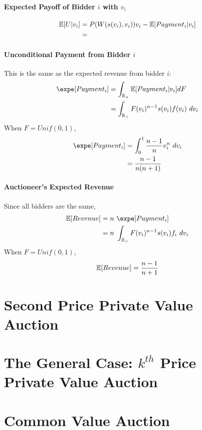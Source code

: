 \documentclass{article}
\begin{document}
	\paragraph{Expected Payoff of Bidder $i$ with $v_i$} 
	\begin{align}
		\mathbb{E}[{U|v_i}] &= P(W(s(v_i), v_i)) v_i - \mathbb{E}[{Payment_i|v_i}] \\
		&= 
	\end{align}
	
	\paragraph{Unconditional Payment from Bidder $i$} This is the same as the expected revenue from bidder $i$:
	\begin{align}
		\expe [Payment_i] &= \int_{\R_+} \expect{Payment_i|v_i} dF \\
		&= \int_{\R_+} F(v_i)^{n-1} s(v_i) f(v_i)\ dv_i
	\end{align}
	When $F = Unif(0, 1)$,
	\begin{align}
		\expe [Payment_i] &= \int_0^1 \frac{n-1}{n}v_i^n\ dv_i \\
		&= \frac{n-1}{n(n+1)}
	\end{align}
	
	\paragraph{Auctioneer's Expected Revenue} Since all bidders are the same,
	\begin{align}
		\expect{Revenue} &= n\ \expe [Payment_i] \\
		&= n\ \int_{\R_+} F(v_i)^{n-1} s(v_i) f_i\ dv_i
	\end{align}
	When $F = Unif(0, 1)$,
	\begin{align}
		\mathbb{E}[{Revenue}] = \frac{n-1}{n+1}
	\end{align}
	
	\section{Second Price Private Value Auction}
	
	\section{The General Case: $k^{th}$ Price Private Value Auction}
	
	\section{Common Value Auction}
	
\end{document}
